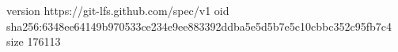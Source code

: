 version https://git-lfs.github.com/spec/v1
oid sha256:6348ee64149b970533ce234e9ee883392ddba5e5d5b7e5c10cbbc352c95fb7c4
size 176113
